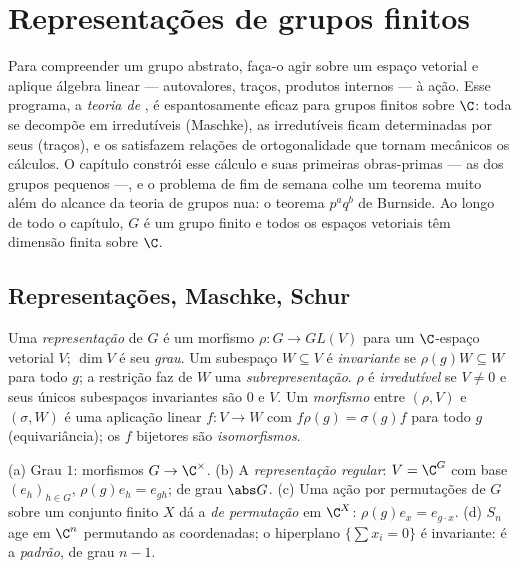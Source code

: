 \chapter{Representações de grupos finitos}\label{ch:b3:representations}

Para compreender um grupo abstrato, faça-o agir sobre um espaço
vetorial e aplique álgebra linear --- autovalores, traços, produtos
internos --- à ação. Esse programa, a \emph{teoria de },
é espantosamente eficaz para grupos finitos sobre $\C$: toda
 se decompõe em irredutíveis (Maschke), as irredutíveis
ficam determinadas por seus \emph{} (traços), e os 
satisfazem relações de ortogonalidade que tornam mecânicos os cálculos.
O capítulo constrói esse cálculo e suas primeiras obras-primas --- as
 dos grupos pequenos ---, e o problema de fim de
semana colhe um teorema muito além do alcance da teoria de grupos nua:
o teorema $p^aq^b$ de Burnside. Ao longo de todo o capítulo, $G$ é
um grupo finito e todos os espaços vetoriais têm dimensão finita sobre
$\C$.

\section{Representações, Maschke, Schur}

\begin{definition}\label{def:b3:representations:rep}
Uma \emph{representação} de $G$ é um morfismo
$\rho \colon G \to GL(V)$ para um $\C$-espaço vetorial $V$; $\dim V$ é seu
\emph{grau}. Um subespaço $W \subseteq V$ é \emph{invariante} se $\rho(g)W \subseteq W$ para todo
$g$; a restrição faz de $W$ uma \emph{subrepresentação}.
$\rho$ é \emph{irredutível} se
$V \neq
0$ e seus únicos subespaços invariantes são $0$ e $V$. Um
\emph{morfismo} entre $(\rho, V)$ e $(\sigma, W)$ é uma aplicação linear $f\colon V \to W$ com $f\rho(g) = \sigma(g)f$
para todo $g$ (equivariância); os $f$ bijetores são
\emph{isomorfismos}.
\end{definition}

\begin{example}\label{ex:b3:representations:examples}
(a) Grau $1$: morfismos $G \to \C^\times$.
(b) A \emph{representação regular}: $V = \C^G$
com base $(e_h)_{h \in G}$, $\rho(g)e_h = e_{gh}$; de grau $\abs G$.
(c) Uma ação por permutações de $G$ sobre um conjunto finito $X$
dá a \emph{ de permutação} em $\C^X$: $\rho(g)e_x =
e_{g\cdot x}$.
(d) $S_n$ age em $\C^n$ permutando as coordenadas; o hiperplano
$\{\sum x_i = 0\}$ é invariante: é a \emph{ padrão}, de grau
$n - 1$.
\end{example}

